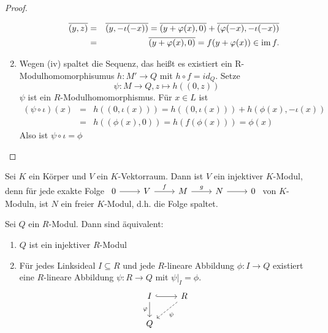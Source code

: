 \begin{proof}
\begin{enumerate}
\begin{itemize}
			\begin{eqnarray*}
				 \overline{(y,z)} &=& \overline{(y, -\iota(-x))} = \overline{(y+\varphi(x), 0)} +\overline{(\varphi(-x), -\iota(-x))}\\
				 & =& \overline{(y+\varphi(x), 0)} = f(y+ \varphi(x)) \in \operatorname{im} f.
			\end{eqnarray*}
		\end{itemize}
	\item Wegen (iv) spaltet die Sequenz, das heißt es existiert ein R-Modulhomomorphisumus $ h: M' \to Q $ mit $h \circ f = id_Q$. Setze $$\psi: M \to Q, z \mapsto h((0,z))$$
	$\psi $ ist ein $R$-Modulhomomorphismus. Für $x \in L $ ist \begin{eqnarray*}
		(\psi \circ \iota)(x)& =& h((0,\iota(x))) = h((0, \iota(x))) + h(\phi(x),-\iota(x))\\
		& =& h((\phi(x),0)) = h(f(\phi(x))) = \phi(x)
		\end{eqnarray*}
	Also ist $\psi \circ \iota = \phi$
	
	\end{enumerate}
\end{proof}
\begin{bsp}
	Sei $K$ ein Körper und $V$ ein $K$-Vektorraum. Dann ist $V$ ein injektiver $K$-Modul, denn für jede exakte Folge $\begin{tikzcd}	0  \arrow{r} & V \arrow{r}{f} & M \arrow{r}{g} & N \arrow{r} & 0 \end{tikzcd}$ von $K$-Moduln, ist $N$ ein freier $K$-Modul, d.h. die Folge spaltet.
\end{bsp}
\begin{sa} Sei $Q$ ein $R$-Modul. Dann sind äquivalent: 
	\begin{enumerate} [label= \roman*)]
		\item $Q$ ist ein injektiver $R$-Modul
		\item Für jedes Linksideal $I \subseteq R $ und jede $R$-lineare Abbildung $\phi: I \to Q $ existiert eine $R$-lineare Abbildung $\psi: R \to Q $ mit $ \psi\big|_{I} = \phi$. 
		$$\begin{tikzcd}
		I \arrow[hook]{r}\arrow[swap]{d}{\phi} & R\arrow[dashed]{dl}{\psi} \\Q &
		\end{tikzcd}$$
	\end{enumerate}
\end{sa}
